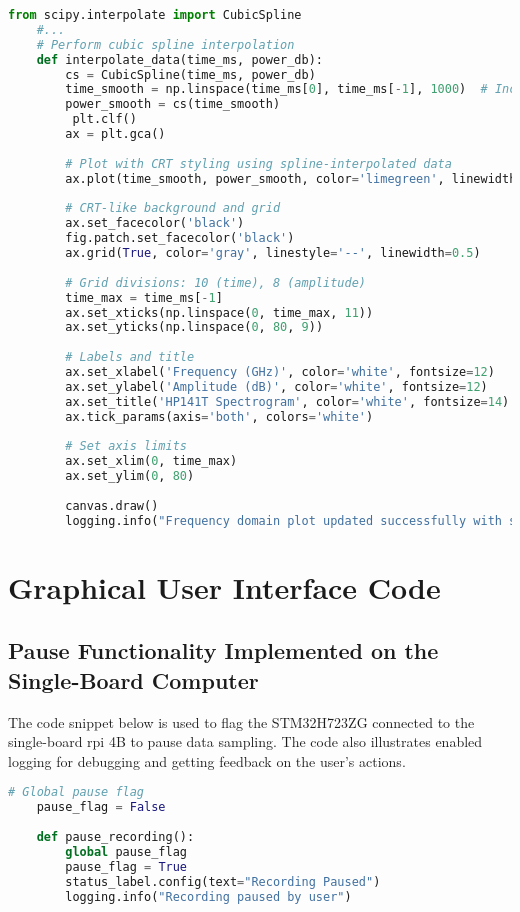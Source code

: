 \documentclass[class=report,11pt,crop=false]{standalone}
\begin{document}
	\begin{lstlisting}[language=Python, caption={Code snippet for performing polynomial interpolation in the \acrshort{dps} to the spectrogram a smoother appearance.}, label={lst:dps-spline}]
	from scipy.interpolate import CubicSpline
	#...
	# Perform cubic spline interpolation
	def interpolate_data(time_ms, power_db):
		cs = CubicSpline(time_ms, power_db)
		time_smooth = np.linspace(time_ms[0], time_ms[-1], 1000)  # Increase resolution
		power_smooth = cs(time_smooth)
		 plt.clf()
		ax = plt.gca()
		
		# Plot with CRT styling using spline-interpolated data
		ax.plot(time_smooth, power_smooth, color='limegreen', linewidth=2)
		
		# CRT-like background and grid
		ax.set_facecolor('black')
		fig.patch.set_facecolor('black')
		ax.grid(True, color='gray', linestyle='--', linewidth=0.5)
		
		# Grid divisions: 10 (time), 8 (amplitude)
		time_max = time_ms[-1]
		ax.set_xticks(np.linspace(0, time_max, 11))
		ax.set_yticks(np.linspace(0, 80, 9))
		
		# Labels and title
		ax.set_xlabel('Frequency (GHz)', color='white', fontsize=12)
		ax.set_ylabel('Amplitude (dB)', color='white', fontsize=12)
		ax.set_title('HP141T Spectrogram', color='white', fontsize=14)
		ax.tick_params(axis='both', colors='white')
		
		# Set axis limits
		ax.set_xlim(0, time_max)
		ax.set_ylim(0, 80)
		
		canvas.draw()
		logging.info("Frequency domain plot updated successfully with spline interpolation")
	\end{lstlisting}

	\section{Graphical User Interface Code}

	\subsection{Pause Functionality Implemented on the Single-Board Computer}
	The code snippet below is used to flag the STM32H723ZG connected to the single-board \acrshort{rpi} 4B to pause data sampling. The code also illustrates enabled logging for debugging and getting feedback on the user's actions.
	\begin{lstlisting}[language=Python, caption={Code snippet for function associated with the pause function in latex.}, label={lst:guis-pause-function}]
	# Global pause flag
	pause_flag = False
	
	def pause_recording():
		global pause_flag
		pause_flag = True
		status_label.config(text="Recording Paused")
		logging.info("Recording paused by user")
	\end{lstlisting}
\end{document}
